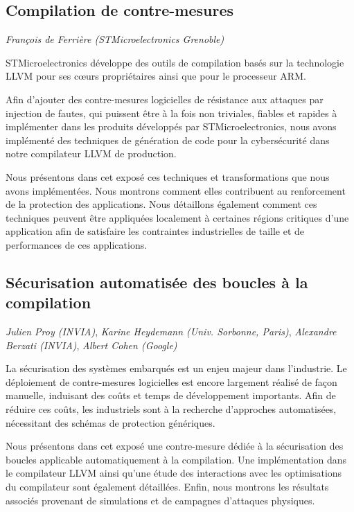 \documentclass[a4paper,11pt]{article}
\begin{document}
\subsection{Compilation de contre-mesures}
\label{sec:org0d12cbe}
\emph{François de Ferrière (STMicroelectronics Grenoble)}

STMicroelectronics développe des outils de compilation basés sur la
technologie LLVM pour ses cœurs propriétaires ainsi que pour le
processeur ARM.

Afin d'ajouter des contre-mesures logicielles de résistance aux attaques
par injection de fautes, qui puissent être à la fois non triviales,
fiables et rapides à implémenter dans les produits développés par
STMicroelectronics, nous avons implémenté des techniques de génération
de code pour la cybersécurité dans notre compilateur LLVM de production.

Nous présentons dans cet exposé ces techniques et transformations que
nous avons implémentées. Nous montrons comment elles contribuent au
renforcement de la protection des applications. Nous détaillons
également comment ces techniques peuvent être appliquées localement à
certaines régions critiques d'une application afin de satisfaire les
contraintes industrielles de taille et de performances de ces applications.

\subsection{Sécurisation automatisée des boucles à la compilation}
\label{sec:orgb1c5b46}
\emph{Julien Proy (INVIA)},
\emph{Karine Heydemann (Univ. Sorbonne, Paris)},
\emph{Alexandre Berzati (INVIA)},
\emph{Albert Cohen (Google)}

La sécurisation des systèmes embarqués est un enjeu majeur dans l'industrie.
Le déploiement de contre-mesures logicielles est encore largement réalisé de façon manuelle, induisant des coûts et temps de développement importants.
Afin de réduire ces coûts, les industriels sont à la recherche d'approches automatisées, nécessitant des schémas de protection génériques.

Nous présentons dans cet exposé une contre-mesure dédiée à la sécurisation des boucles applicable automatiquement à la compilation.
Une implémentation dans le compilateur LLVM ainsi qu'une étude des interactions avec les optimisations du compilateur sont également détaillées.
Enfin, nous montrons les résultats associés provenant de simulations et de campagnes d'attaques physiques.
\end{document}
